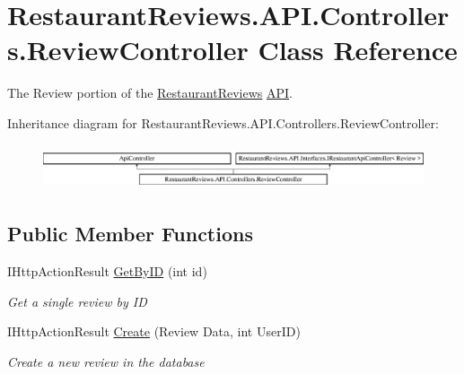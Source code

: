 \hypertarget{class_restaurant_reviews_1_1_a_p_i_1_1_controllers_1_1_review_controller}{}\section{Restaurant\+Reviews.\+A\+P\+I.\+Controllers.\+Review\+Controller Class Reference}
\label{class_restaurant_reviews_1_1_a_p_i_1_1_controllers_1_1_review_controller}


The Review portion of the \hyperlink{namespace_restaurant_reviews}{Restaurant\+Reviews} \hyperlink{namespace_restaurant_reviews_1_1_a_p_i}{A\+PI}.  


Inheritance diagram for Restaurant\+Reviews.\+A\+P\+I.\+Controllers.\+Review\+Controller\+:\begin{figure}[H]
\begin{center}
\leavevmode
\includegraphics[height=1.339713cm]{class_restaurant_reviews_1_1_a_p_i_1_1_controllers_1_1_review_controller}
\end{center}
\end{figure}
\subsection*{Public Member Functions}
\begin{DoxyCompactItemize}
\item 
I\+Http\+Action\+Result \hyperlink{class_restaurant_reviews_1_1_a_p_i_1_1_controllers_1_1_review_controller_a9e2c790ea799598d8cee1391c3ac1bc2}{Get\+By\+ID} (int id)
\begin{DoxyCompactList}\small\item\em Get a single review by ID \end{DoxyCompactList}\item 
I\+Http\+Action\+Result \hyperlink{class_restaurant_reviews_1_1_a_p_i_1_1_controllers_1_1_review_controller_a53ab32d4786fe0f35bace5cf4566cd88}{Create} (Review Data, int User\+ID)
\begin{DoxyCompactList}\small\item\em Create a new review in the database \end{DoxyCompactList}\end{DoxyCompactItemize}


